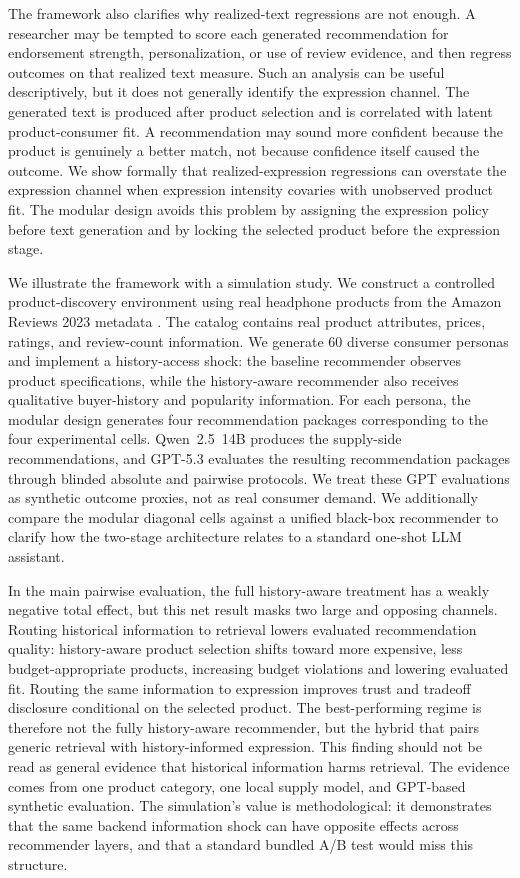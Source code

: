\documentclass[11pt]{article}
\begin{document}
The framework also clarifies why realized-text regressions are not enough. A researcher may be tempted to score each generated recommendation for endorsement strength, personalization, or use of review evidence, and then regress outcomes on that realized text measure. Such an analysis can be useful descriptively, but it does not generally identify the expression channel. The generated text is produced after product selection and is correlated with latent product-consumer fit. A recommendation may sound more confident because the product is genuinely a better match, not because confidence itself caused the outcome. We show formally that realized-expression regressions can overstate the expression channel when expression intensity covaries with unobserved product fit. The modular design avoids this problem by assigning the expression policy before text generation and by locking the selected product before the expression stage.

We illustrate the framework with a simulation study. We construct a controlled product-discovery environment using real headphone products from the Amazon Reviews 2023 metadata \citep{hou2024amazon}. The catalog contains real product attributes, prices, ratings, and review-count information. We generate 60 diverse consumer personas and implement a history-access shock: the baseline recommender observes product specifications, while the history-aware recommender also receives qualitative buyer-history and popularity information. For each persona, the modular design generates four recommendation packages corresponding to the four experimental cells. Qwen~2.5~14B produces the supply-side recommendations, and GPT-5.3 evaluates the resulting recommendation packages through blinded absolute and pairwise protocols. We treat these GPT evaluations as synthetic outcome proxies, not as real consumer demand. We additionally compare the modular diagonal cells against a unified black-box recommender to clarify how the two-stage architecture relates to a standard one-shot LLM assistant.

In the main pairwise evaluation, the full history-aware treatment has a weakly negative total effect, but this net result masks two large and opposing channels. Routing historical information to retrieval lowers evaluated recommendation quality: history-aware product selection shifts toward more expensive, less budget-appropriate products, increasing budget violations and lowering evaluated fit. Routing the same information to expression improves trust and tradeoff disclosure conditional on the selected product. The best-performing regime is therefore not the fully history-aware recommender, but the hybrid that pairs generic retrieval with history-informed expression. This finding should not be read as general evidence that historical information harms retrieval. The evidence comes from one product category, one local supply model, and GPT-based synthetic evaluation. The simulation's value is methodological: it demonstrates that the same backend information shock can have opposite effects across recommender layers, and that a standard bundled A/B test would miss this structure.
\end{document}
